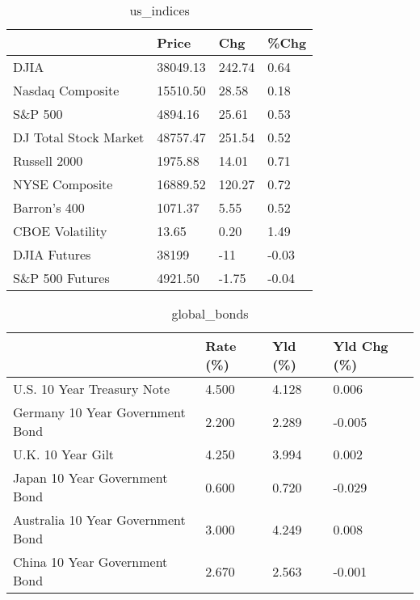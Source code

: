 \documentclass{article}%
\begin{document}
%


\begin{table}[htbp]%
\caption{us\_indices}%
\centering%
\begin{adjustbox}{width=1\textwidth}%
\begin{tabular}{llll}
\toprule
                      &    Price &    Chg &  \%Chg \\
\midrule
                 DJIA & 38049.13 & 242.74 &  0.64 \\
     Nasdaq Composite & 15510.50 &  28.58 &  0.18 \\
              S\&P 500 &  4894.16 &  25.61 &  0.53 \\
DJ Total Stock Market & 48757.47 & 251.54 &  0.52 \\
         Russell 2000 &  1975.88 &  14.01 &  0.71 \\
       NYSE Composite & 16889.52 & 120.27 &  0.72 \\
         Barron's 400 &  1071.37 &   5.55 &  0.52 \\
      CBOE Volatility &    13.65 &   0.20 &  1.49 \\
         DJIA Futures &    38199 &    -11 & -0.03 \\
      S\&P 500 Futures &  4921.50 &  -1.75 & -0.04 \\
\bottomrule
\end{tabular}
%
\end{adjustbox}%
\end{table}

%


\begin{table}[htbp]%
\caption{global\_bonds}%
\centering%
\begin{adjustbox}{width=1\textwidth}%
\begin{tabular}{llll}
\toprule
                                  & Rate (\%) & Yld (\%) & Yld Chg (\%) \\
\midrule
       U.S. 10 Year Treasury Note &    4.500 &   4.128 &       0.006 \\
  Germany 10 Year Government Bond &    2.200 &   2.289 &      -0.005 \\
                U.K. 10 Year Gilt &    4.250 &   3.994 &       0.002 \\
    Japan 10 Year Government Bond &    0.600 &   0.720 &      -0.029 \\
Australia 10 Year Government Bond &    3.000 &   4.249 &       0.008 \\
    China 10 Year Government Bond &    2.670 &   2.563 &      -0.001 \\
\bottomrule
\end{tabular}
%
\end{adjustbox}%
\end{table}
\end{document}
